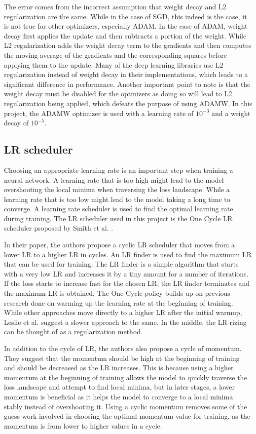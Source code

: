 \documentclass[a4paper,11pt,openright]{book}
\begin{document}
The error comes from the incorrect assumption that weight decay and L2 regularization are the same. While in the case of SGD, this indeed is the case, it is not true for other optimizers, especially ADAM. In the case of ADAM, weight decay first applies the update and then subtracts a portion of the weight. While L2 regularization adds the weight decay term to the gradients and then computes the moving average of the gradients and the corresponding squares before applying them to the update. Many of the deep learning libraries use L2 regularization instead of weight decay in their implementations, which leads to a significant difference in performance. Another important point to note is that the weight decay must be disabled for the optmizers as doing so will lead to L2 regularization being applied, which defeats the purpose of using ADAMW.
In this project, the ADAMW optimizer is used with a learning rate of $10^{-3}$ and a weight decay of $10^{-5}$.

\subsection{LR scheduler}
Choosing an appropriate learning rate is an important step when training a neural network. A learning rate that is too high might lead to the model overshooting the local minima when traversing the loss landscape. While a learning rate that is too low might lead to the model taking a long time to converge. A learning rate scheduler is used to find the optimal learning rate during training. The LR scheduler used in this project is the One Cycle LR scheduler proposed by Smith et al. \cite{smithSuperConvergenceVeryFast2018}.

In their paper, the authors propose a cyclic LR scheduler that moves from a lower LR to a higher LR in cycles. An LR finder is used to find the maximum LR that can be used for training. The LR finder is a simple algorithm that starts with a very low LR and increases it by a tiny amount for a number of iterations. If the loss starts to increase fast for the chosen LR, the LR finder terminates and the maximum LR is obtained. 
The One Cycle policy builds up on previous research done on warming up the learning rate at the beginning of training. While other approaches move directly to a higher LR after the initial warmup, Leslie et al. suggest a slower approach to the same. In the middle, the LR rizing can be thought of as a regularization method.

In addition to the cycle of LR, the authors also propose a cycle of momentum. They suggest that the momentum should be high at the beginning of training and should be decreased as the LR increases. This is because using a higher momentum at the beginning of training allows the model to quickly traverse the loss landscape and attempt to find local minima, but in later stages, a lower momentum is beneficial as it helps the model to converge to a local minima stably instead of overshooting it. Using a cyclic momentum removes some of the guess work involved in choosing the optimal momentum value for training, as the momentum is from lower to higher values in a cycle. 
\end{document}
